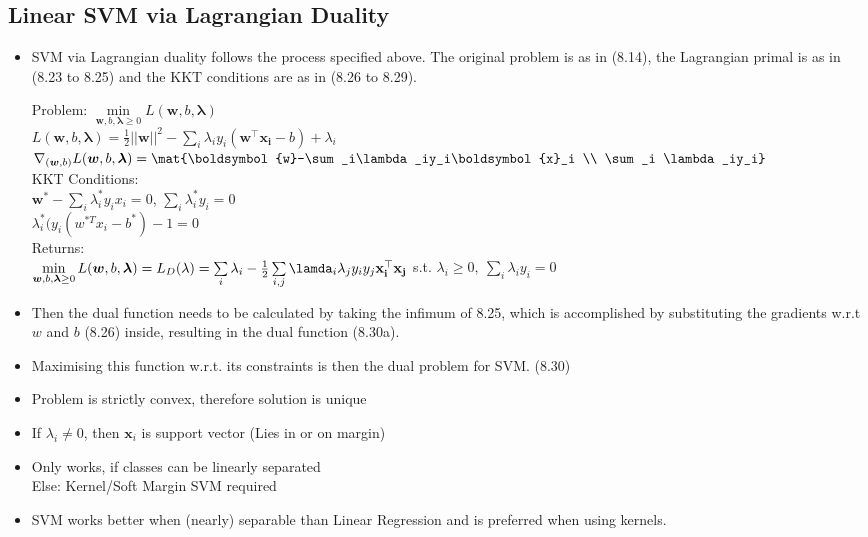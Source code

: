 \documentclass[english]{latex4ei/latex4ei_sheet}
\begin{document}
\begin{sectionbox}
\subsection{Linear SVM via Lagrangian Duality}
\begin{itemize}
\item SVM via Lagrangian duality follows the process specified above. The original problem is as in (8.14), the Lagrangian primal is as in (8.23 to 8.25) and the KKT conditions are as in (8.26 to 8.29). 
\begin{emphbox}
    Problem: $\min\limits_{\boldsymbol{w}, b, \boldsymbol{\lambda}\ge0} L(\boldsymbol{w}, b, \boldsymbol{\lambda})$ \\  $L(\boldsymbol{w}, b, \boldsymbol{\lambda})= \frac{1}{2}||\boldsymbol{w}||^2 - \sum\limits_i \lambda_i y_i(\boldsymbol{w^{\top}x_i}-b)+\lambda_i $\\
    		$\nabla_{(\boldsymbol{w},b)}L(\boldsymbol{w}, b, \boldsymbol{\lambda})=\mat{\boldsymbol{w}-\sum_i\lambda_iy_i\boldsymbol{x}_i \\ \sum_i \lambda_iy_i}$\\
    KKT Conditions:\\ $\mathbf{w^*}-\sum_i\lambda_i^*y_ix_i=0$, \quad $\sum_i\lambda^*_iy_i=0$\\
    $\lambda_i^*(y_i(w^{*T}x_i-b^*)-1=0$\\
    Returns: \\
    $\min\limits_{\boldsymbol{w}, b, \boldsymbol{\lambda}\ge0} L(\boldsymbol{w}, b, \boldsymbol{\lambda})=L_D(\mathbf{\lambda})=
    \sum\limits_i\lambda_i-\frac{1}{2}\sum\limits_{i,j}\lamda_i\lambda_jy_iy_j\mathbf{x_i^{\top}x_j}$ s.t. $\lambda_i\ge0, \ \sum_i\lambda_iy_i=0$
\end{emphbox}

\item Then the dual function needs to be calculated by taking the infimum of 8.25, which is accomplished by substituting the gradients w.r.t $w$ and $b$ (8.26) inside, resulting in the dual function (8.30a).
\item Maximising this function w.r.t. its constraints is then the dual problem for SVM. (8.30)

\item Problem is strictly convex, therefore solution is unique
\item If $\lambda_i \ne 0$, then $\boldsymbol{x}_i$ is support vector (Lies in or on margin)
\item Only works, if classes can be linearly separated \\
Else: Kernel/Soft Margin SVM required
\item SVM works better when (nearly) separable than Linear Regression and is preferred when using kernels.
\end{itemize}
\end{sectionbox}
\end{document}
